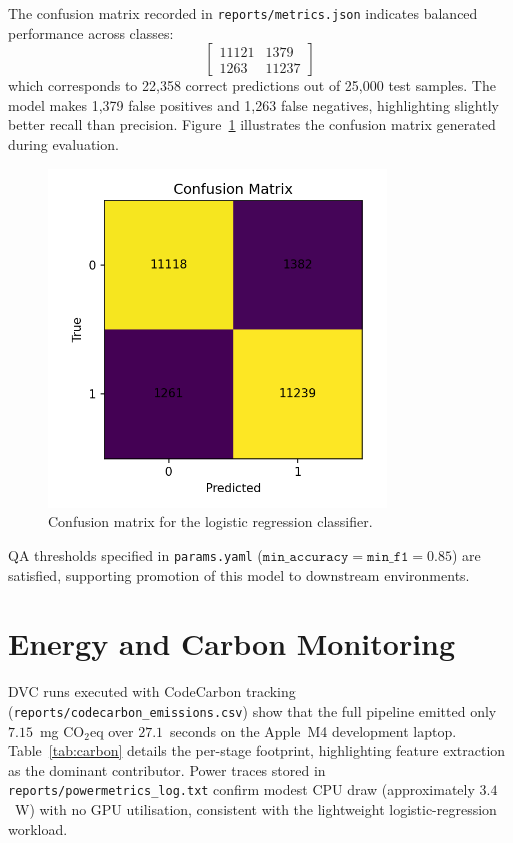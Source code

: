 \documentclass[11pt,a4paper]{article}
\begin{document}
The confusion matrix recorded in \texttt{reports/metrics.json} indicates balanced performance across classes:
\[
\begin{bmatrix}
11121 & 1379 \\
1263 & 11237
\end{bmatrix}
\]
which corresponds to 22{,}358 correct predictions out of 25{,}000 test samples. The model makes 1{,}379 false positives and 1{,}263 false negatives, highlighting slightly better recall than precision. Figure~\ref{fig:cm} illustrates the confusion matrix generated during evaluation.

\begin{figure}[h]
  \centering
  \includegraphics[width=0.8\textwidth]{baseline_confusion_matrix.png}
  \caption{Confusion matrix for the logistic regression classifier.}
  \label{fig:cm}
\end{figure}

QA thresholds specified in \texttt{params.yaml} (\( \texttt{min\_accuracy} = \texttt{min\_f1} = 0.85 \)) are satisfied, supporting promotion of this model to downstream environments.

\section{Energy and Carbon Monitoring}
DVC runs executed with CodeCarbon tracking (\texttt{reports/codecarbon\_emissions.csv}) show that the full pipeline emitted only \(7.15\)~mg CO\(_2\)eq over \(27.1\)~seconds on the Apple~M4 development laptop. Table~\ref{tab:carbon} details the per-stage footprint, highlighting feature extraction as the dominant contributor. Power traces stored in \texttt{reports/powermetrics\_log.txt} confirm modest CPU draw (approximately \(3.4\)~W) with no GPU utilisation, consistent with the lightweight logistic-regression workload.
\end{document}
